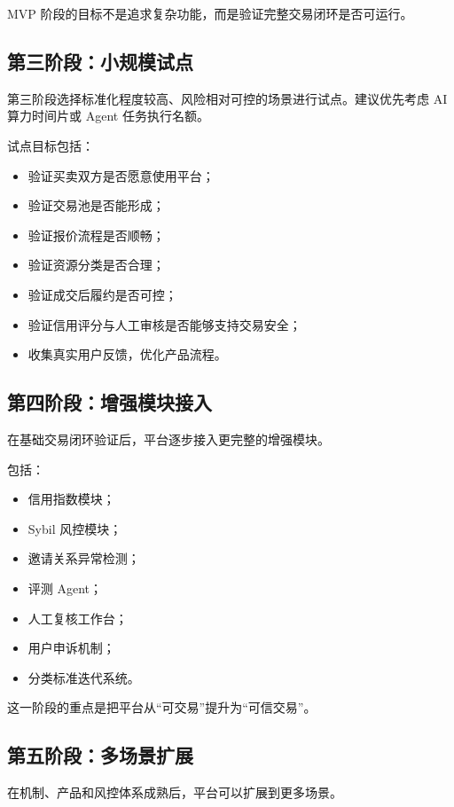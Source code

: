 \documentclass[UTF8,a4paper,12pt]{ctexart}
\begin{document}
MVP 阶段的目标不是追求复杂功能，而是验证完整交易闭环是否可运行。

\subsection{第三阶段：小规模试点}

第三阶段选择标准化程度较高、风险相对可控的场景进行试点。建议优先考虑 AI 算力时间片或 Agent 任务执行名额。

试点目标包括：

\begin{itemize}
    \item 验证买卖双方是否愿意使用平台；
    \item 验证交易池是否能形成；
    \item 验证报价流程是否顺畅；
    \item 验证资源分类是否合理；
    \item 验证成交后履约是否可控；
    \item 验证信用评分与人工审核是否能够支持交易安全；
    \item 收集真实用户反馈，优化产品流程。
\end{itemize}

\subsection{第四阶段：增强模块接入}

在基础交易闭环验证后，平台逐步接入更完整的增强模块。

包括：

\begin{itemize}
    \item 信用指数模块；
    \item Sybil 风控模块；
    \item 邀请关系异常检测；
    \item 评测 Agent；
    \item 人工复核工作台；
    \item 用户申诉机制；
    \item 分类标准迭代系统。
\end{itemize}

这一阶段的重点是把平台从“可交易”提升为“可信交易”。

\subsection{第五阶段：多场景扩展}

在机制、产品和风控体系成熟后，平台可以扩展到更多场景。
\end{document}
